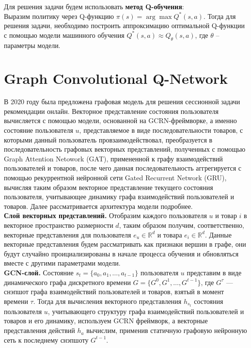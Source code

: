 \documentclass{mipt-thesis-ms}
\begin{document}
Для решения задачи будем использовать {\bf метод Q-обучения}: \\Выразим политику через Q-функцию $\pi(s) = \arg \max Q^*(s, a)$. Тогда для решения задачи, необходимо построить аппроксимацию оптимальной Q-функции с помощью модели машинного обучения $Q^*(s, a) \approx Q_{\theta}(s, a)$, где $\theta$ -- параметры модели.


\section{Graph Convolutional Q-Network}
В 2020 году была предложена графовая модель для решения сессионной задачи рекомендации онлайн. Векторное представление состояния пользователя вычисляется с помощью модели, основанной на GCRN-фреймворке, а именно состояние пользователя $u$, представляемое в виде последовательности товаров, с которыми данный пользователь провзаимодействовал, преобразуется в последовательность графовых векторных представлений, полученных с помощью Graph Attention Netowork (GAT), примененной к графу взаимодействий пользователей и товаров, после чего данная последовательность аггрегируется с помощью рекуррентной нейронной сети Gated Recurrent Network (GRU), вычисляя таким образом векторное представление текущего состояния пользователя, учитывающее динамику графа взаимодействий пользователей и товаров. Далее рассматривается архитектура модели подробнее.
\\

{\bf Слой векторных представлений.} Отобразим каждого пользователя $u$ и товар $i$ в векторное пространство размерности $d$, таким образом получим, соответственно, векторные представления для пользователя $e_u \in \mathbb{R}^d$ и товара $e_i \in \mathbb{R}^d$. Данные векторные представления будем рассматривать как признаки вершин в графе, они будут случайно проициализированы в начале процесса обучения и обновляться вместе с другими параметрами модели.\\

{\bf GCN-слой.} Состояние $s_t = \{a_0, a_1, \dots, a_{t-1}\}$ пользователя $u$ представим в виде динамического графа дискретного времени $G = \{G^0, G^1, \dots, G^{t-1}\}$, где $G^{\tau}$ --- снэпшот графа взаимодействий пользователей и товаров, взятый в момент времени $\tau$. Тогда для вычисления векторного представления $h_{s_t}$ состояния пользователя $u$, учитывающего структуру графа взаимодействий пользователей и товаров и его динамику, используем GCRN фреймворк, а векторные представления действий $h_a$ вычислим, применив статичную графовую нейронную сеть к последнему снэпшоту $G^{t-1}$.\\
\end{document}
